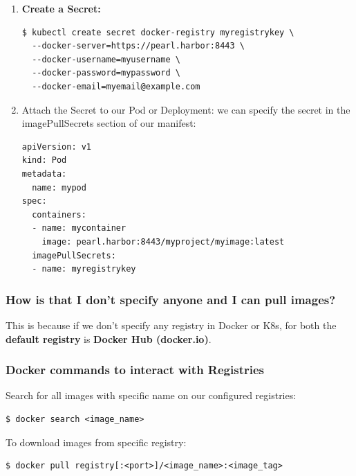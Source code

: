 \documentclass{article}
\newenvironment{codetemplate}[1][]{%
  \mybasecolorbox[#1]
  \itshape
}{%
  \endmybasecolorbox
}
\begin{document}
\begin{enumerate}
    \item \textbf{Create a Secret:}
\begin{codetemplate}{}
\begin{verbatim}
$ kubectl create secret docker-registry myregistrykey \
  --docker-server=https://pearl.harbor:8443 \
  --docker-username=myusername \
  --docker-password=mypassword \
  --docker-email=myemail@example.com
\end{verbatim}
\end{codetemplate}

    \item Attach the Secret to our Pod or Deployment: we can specify the secret in the imagePullSecrets section of our manifest:
\begin{codetemplate}{}
\begin{verbatim}
apiVersion: v1
kind: Pod
metadata:
  name: mypod
spec:
  containers:
  - name: mycontainer
    image: pearl.harbor:8443/myproject/myimage:latest
  imagePullSecrets:
  - name: myregistrykey
\end{verbatim}
\end{codetemplate}
\end{enumerate}

\subsubsection{How is that I don't specify anyone and I can pull images?}
This is because if we don't specify any registry in Docker 
or K8s, for both the \textbf{default registry} is \textbf{Docker Hub (docker.io)}.

\subsubsection{Docker commands to interact with Registries}
Search for all images with specific name on our configured registries:
\begin{codetemplate}{}
\begin{verbatim}
$ docker search <image_name>
\end{verbatim}
\end{codetemplate}

To download images from specific registry:
\begin{codetemplate}{}
\begin{verbatim}
$ docker pull registry[:<port>]/<image_name>:<image_tag>
\end{verbatim}
\end{codetemplate}
\end{document}
